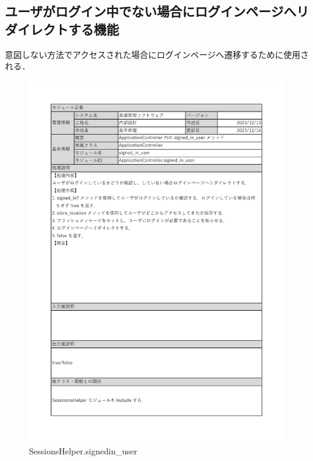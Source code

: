 \subsection*{ユーザがログイン中でない場合にログインページへリダイレクトする機能}
意図しない方法でアクセスされた場合にログインページへ遷移するために使用される．
\begin{figure}[H]
    \centering
    \includegraphics[scale=0.5]{img/Helper/signed_in_user.pdf}
    \caption{SessionsHelper.signed\/in\_user}
\end{figure}
\clearpage

